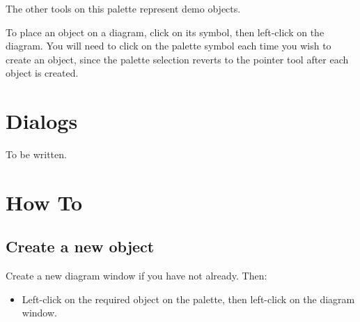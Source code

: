 The other tools on this palette represent demo objects.

To place an object on a diagram, click on its symbol, then left-click on the diagram. You will need to click
on the palette symbol each time you wish to create an object, since the palette selection reverts to the pointer tool
after each object is created.

\chapter{Dialogs}\label{dialogs}%
%
\setfooter{\thepage}{}{}{}{}{\thepage}%

To be written.

\chapter{How To}\label{howto}%
%
\setfooter{\thepage}{}{}{}{}{\thepage}%

\section{Create a new object}

Create a new diagram window if you have not already. Then:

\begin{itemize}\itemsep=0pt
\item Left-click on the required object on the palette, then left-click on the diagram window.
\end{itemize}


\begin{comment}

\addcontentsline{toc}{chapter}{Bibliography}
\setheader{{\it REFERENCES}}{}{}{}{}{{\it REFERENCES}}%
\setfooter{\thepage}{}{}{}{}{\thepage}%
\end{comment}

\printindex%

%
\setfooter{\thepage}{}{}{}{}{\thepage}%


